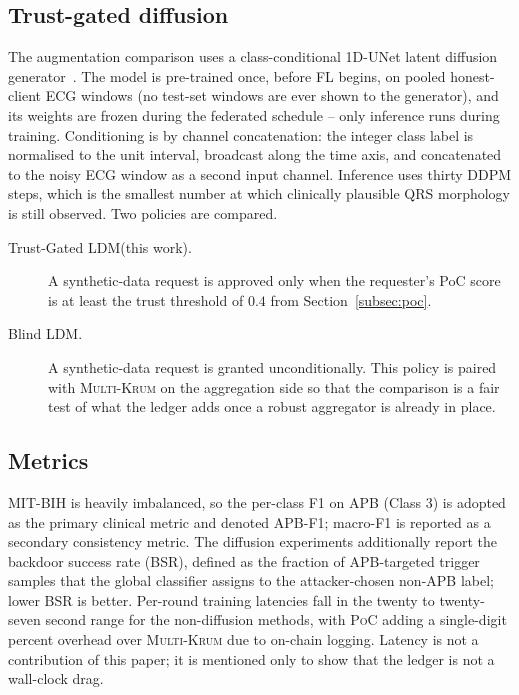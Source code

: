 \documentclass[runningheads]{llncs}
\newcommand{\mkrum}{\textsc{Multi-Krum}\xspace}
\newcommand{\poc}{\textsc{PoC}\xspace}
\newcommand{\tgldm}{Trust-Gated LDM\xspace}
\newcommand{\bldm}{Blind LDM\xspace}
\begin{document}
\subsection{Trust-gated diffusion}
The augmentation comparison uses a class-conditional 1D-UNet latent
diffusion generator~\cite{ho2020ddpm,rombach2022ldm}. The
model is pre-trained once, before FL begins, on pooled honest-client
ECG windows (no test-set windows are ever shown to the generator),
and its weights are frozen during the federated schedule -- only
inference runs during training. Conditioning is by channel
concatenation: the integer class label is normalised to the unit
interval, broadcast along the time axis, and concatenated to the
noisy ECG window as a second input channel. Inference uses thirty
DDPM steps, which is the smallest number at which clinically
plausible QRS morphology is still observed. Two policies are
compared.
\begin{description}
\item[\tgldm (this work).] A synthetic-data request is approved
only when the requester's PoC score is at least the trust threshold
of $0.4$ from Section~\ref{subsec:poc}.
\item[\bldm.] A synthetic-data request is granted unconditionally.
This policy is paired with \mkrum on the aggregation side so that
the comparison is a fair test of what the ledger adds once a robust
aggregator is already in place.
\end{description}

\subsection{Metrics}
\label{subsec:metrics}
MIT-BIH is heavily imbalanced, so the per-class F1 on APB
(Class 3) is adopted as the primary clinical metric and denoted
APB-F1; macro-F1 is reported as a secondary consistency metric. The
diffusion experiments additionally report the backdoor success rate
(BSR), defined as the fraction of APB-targeted trigger samples that
the global classifier assigns to the attacker-chosen non-APB label;
lower BSR is better. Per-round training latencies fall in the twenty
to twenty-seven second range for the non-diffusion methods, with
\poc adding a single-digit percent overhead over \mkrum due to
on-chain logging. Latency is not a contribution of this paper; it is
mentioned only to show that the ledger is not a wall-clock drag.

\end{document}

